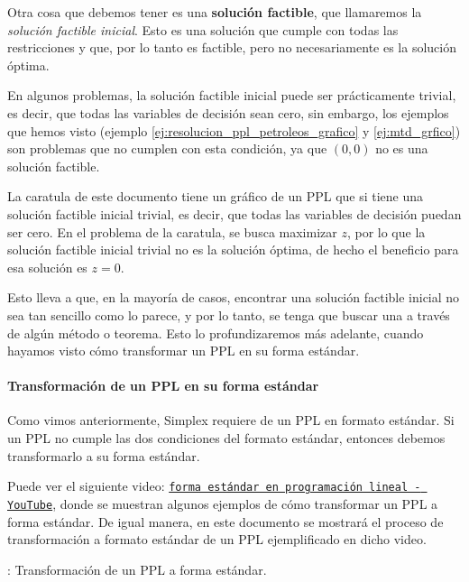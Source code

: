 Otra cosa que debemos tener es una \textbf{solución factible}, que llamaremos la \textit{solución factible inicial}. Esto es una solución que cumple con todas las restricciones y que, por lo tanto es factible, pero no necesariamente es la solución óptima. 

En algunos problemas, la solución factible inicial puede ser prácticamente trivial, es decir, que todas las variables de decisión sean cero, sin embargo, los ejemplos que hemos visto (ejemplo \ref{ej:resolucion_ppl_petroleos_grafico} y \ref{ej:mtd_grfico}) son problemas que no cumplen con esta condición, ya que \((0,0)\) no es una solución factible. 

\begin{tcolorbox}[interesting_data, title=Dato curioso]
  La caratula de este documento tiene un gráfico de un PPL que si tiene una solución factible inicial trivial, es decir, que todas las variables de decisión puedan ser cero. En el problema de la caratula, se busca maximizar \(z\), por lo que la solución factible inicial trivial no es la solución óptima, de hecho el beneficio para esa solución es \(z = 0\). 
\end{tcolorbox}

Esto lleva a que, en la mayoría de casos, encontrar una solución factible inicial no sea tan sencillo como lo parece, y por lo tanto, se tenga que buscar una a través de algún método o teorema. Esto lo profundizaremos más adelante, cuando hayamos visto cómo transformar un PPL en su forma estándar.

\paragraph{Transformación de un PPL en su forma estándar}

Como vimos anteriormente, Simplex requiere de un PPL en formato estándar. Si un PPL no cumple las dos condiciones del formato estándar, entonces debemos transformarlo a su forma estándar. 

Puede ver el siguiente video: \href{https://www.youtube.com/watch?v=6f5K3O7yUzU}{\texttt{forma estándar en programación lineal - YouTube}}, donde se muestran algunos ejemplos de cómo transformar un PPL a forma estándar. De igual manera, en este documento se mostrará el proceso de transformación a formato estándar de un PPL ejemplificado en dicho video. 

\ejemplo\label{ej:transformacion_ppl_forma_estandar}: Transformación de un PPL a forma estándar.

